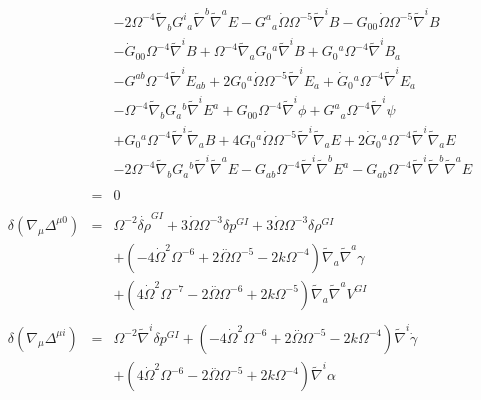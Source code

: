 \begin{eqnarray}
\nonumber\\
&&- 2 \Omega^{-4} \tilde{\nabla}_{b}G^{i}{}_{a} \tilde{\nabla}^{b}\tilde{\nabla}^{a}E  -  G^{a}{}_{a} \dot{\Omega} \Omega^{-5} \tilde{\nabla}^{i}B -  G_{00}{} \dot{\Omega} \Omega^{-5} \tilde{\nabla}^{i}B 
\nonumber\\
&&-  \dot{G}_{00}{} \Omega^{-4} \tilde{\nabla}^{i}B 
+ \Omega^{-4} \tilde{\nabla}_{a}G_{0}{}^{a} \tilde{\nabla}^{i}B + G_{0}{}^{a} \Omega^{-4} \tilde{\nabla}^{i}B_{a} 
\nonumber\\
&&-  G^{ab} \Omega^{-4} \tilde{\nabla}^{i}E_{ab} 
+ 2 G_{0}{}^{a} \dot{\Omega} \Omega^{-5} \tilde{\nabla}^{i}E_{a} + \dot{G}_{0}{}^{a} \Omega^{-4} \tilde{\nabla}^{i}E_{a} 
\nonumber\\
&&-  \Omega^{-4} \tilde{\nabla}_{b}G_{a}{}^{b} \tilde{\nabla}^{i}E^{a} 
+ G_{00}{} \Omega^{-4} \tilde{\nabla}^{i}\phi  + G^{a}{}_{a} \Omega^{-4} \tilde{\nabla}^{i}\psi 
\nonumber\\
&&+ G_{0}{}^{a} \Omega^{-4} \tilde{\nabla}^{i}\tilde{\nabla}_{a}B + 4 G_{0}{}^{a} \dot{\Omega} \Omega^{-5} \tilde{\nabla}^{i}\tilde{\nabla}_{a}E 
+ 2 \dot{G}_{0}{}^{a} \Omega^{-4} \tilde{\nabla}^{i}\tilde{\nabla}_{a}E
\nonumber\\
&& - 2 \Omega^{-4} \tilde{\nabla}_{b}G_{a}{}^{b} \tilde{\nabla}^{i}\tilde{\nabla}^{a}E -  G_{ab} \Omega^{-4} \tilde{\nabla}^{i}\tilde{\nabla}^{b}E^{a} 
-  G_{ab} \Omega^{-4} \tilde{\nabla}^{i}\tilde{\nabla}^{b}\tilde{\nabla}^{a}E
\nonumber\\  \nonumber\\ 
&=&0
\\ \nonumber\\
\delta(\nabla_\mu \Delta^{\mu 0})&=& \Omega^{-2} \dot{\delta \rho}^{GI}{} + 3 \dot{\Omega} \Omega^{-3} \delta p^{GI}{} + 3 \dot{\Omega} \Omega^{-3} \delta \rho^{GI}{} \nonumber \\ 
&& + (-4 \dot{\Omega}^2 \Omega^{-6} + 2 \overset{..}{\Omega} \Omega^{-5} - 2 k \Omega^{-4}) \tilde{\nabla}_{a}\tilde{\nabla}^{a}\gamma 
\nonumber\\
&&+(4 \dot{\Omega}^2 \Omega^{-7} - 2 \overset{..}{\Omega} \Omega^{-6} + 2 k \Omega^{-5}) \tilde{\nabla}_{a}\tilde{\nabla}^{a}V^{GI}{}
\\  \nonumber\\ 
\delta(\nabla_\mu \Delta^{\mu i})&=& \Omega^{-2} \tilde{\nabla}^{i}\delta p^{GI}{} + (-4 \dot{\Omega}^2 \Omega^{-6} + 2 \overset{..}{\Omega} \Omega^{-5} - 2 k \Omega^{-4}) \tilde{\nabla}^{i}\dot{\gamma} \nonumber \\ 
&& + (4 \dot{\Omega}^2 \Omega^{-6} - 2 \overset{..}{\Omega} \Omega^{-5} + 2 k \Omega^{-4}) \tilde{\nabla}^{i}\alpha 

\end{eqnarray}
